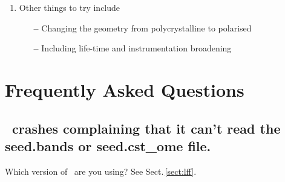 \documentclass[a4paper,11pt,twoside]{book}
\begin{document}
{\begin{enumerate}
\begin{verbatim}
     %BLOCK POSITIONS_FRAC
            Si:exi    0.0000000000    0.0000000000    0.0000000000
            Si        0.5000000000    0.5000000000    0.0000000000  
            Si        0.5000000000    0.0000000000    0.5000000000
            Si        0.0000000000    0.5000000000    0.5000000000
            Si        0.2500000000    0.2500000000    0.2500000000
            Si        0.7500000000    0.2500000000    0.7500000000
            Si        0.2500000000    0.7500000000    0.7500000000
            Si        0.7500000000    0.7500000000    0.2500000000
      %ENDBLOCK POSITIONS_FRAC
\end{verbatim}
Run \optados\ and compare the spectrum from the face-centred unit cell with that from the primitive unit cell.  Continue constructing larger unit cells until the core-hole spectrum stops changing with increasing separation between the periodic images.  

\item Other things to try include
\begin{itemize}
\item[{\bf --}] Changing the geometry from polycrystalline to polarised
\item[{\bf --}] Including life-time and instrumentation broadening
\end{itemize}
\end{enumerate}

\chapter{Frequently Asked Questions}

\section{\optados\ crashes complaining that it can't read the
  seed.bands or seed.cst\_ome file.}
Which version of \castep\ are you using? See Sect.\,\ref{sect:lff}.

}
\end{document}
